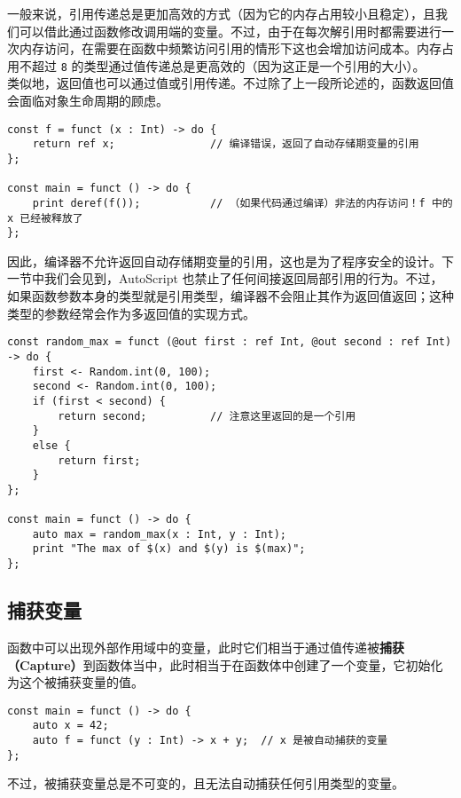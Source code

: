 一般来说，引用传递总是更加高效的方式（因为它的内存占用较小且稳定），且我们可以借此通过函数修改调用端的变量。不过，由于在每次解引用时都需要进行一次内存访问，在需要在函数中频繁访问引用的情形下这也会增加访问成本。内存占用不超过 \lstinline!8! 的类型通过值传递总是更高效的（因为这正是一个引用的大小）。 \\

类似地，返回值也可以通过值或引用传递。不过除了上一段所论述的，函数返回值会面临对象生命周期的顾虑。

\begin{lstlisting}
const f = funct (x : Int) -> do {
	return ref x;				// 编译错误，返回了自动存储期变量的引用
};

const main = funct () -> do {
	print deref(f());			// （如果代码通过编译）非法的内存访问！f 中的 x 已经被释放了
};
\end{lstlisting}

因此，编译器不允许返回自动存储期变量的引用，这也是为了程序安全的设计。下一节中我们会见到，AutoScript 也禁止了任何间接返回局部引用的行为。不过，如果函数参数本身的类型就是引用类型，编译器不会阻止其作为返回值返回；这种类型的参数经常会作为多返回值的实现方式。

\begin{lstlisting}
const random_max = funct (@out first : ref Int, @out second : ref Int) -> do {
	first <- Random.int(0, 100);
	second <- Random.int(0, 100);
	if (first < second) {
	    return second;			// 注意这里返回的是一个引用
	}
	else {
	    return first;
	}
};

const main = funct () -> do {
    auto max = random_max(x : Int, y : Int);
    print "The max of $(x) and $(y) is $(max)";
};
\end{lstlisting}


\subsection{捕获变量}

函数中可以出现外部作用域中的变量，此时它们相当于通过值传递被\textbf{捕获（Capture）}到函数体当中，此时相当于在函数体中创建了一个变量，它初始化为这个被捕获变量的值。

\begin{lstlisting}
const main = funct () -> do {
	auto x = 42;
	auto f = funct (y : Int) -> x + y;	// x 是被自动捕获的变量
};
\end{lstlisting}

不过，被捕获变量总是不可变的，且无法自动捕获任何引用类型的变量。

